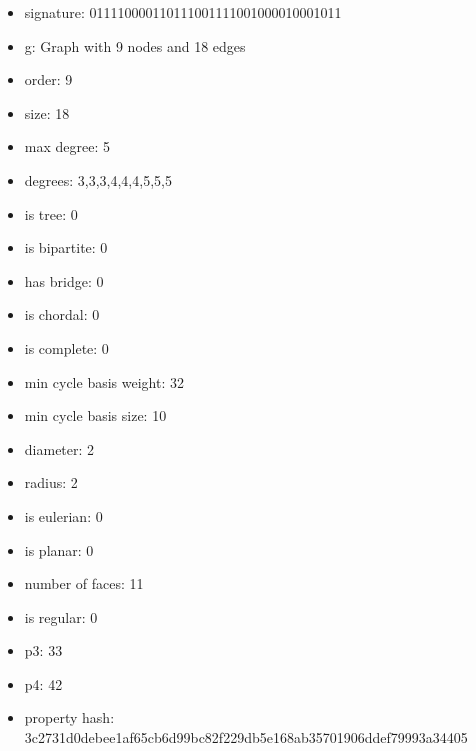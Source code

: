 \newpage
\begin{figure}
\end{figure}
\begin{itemize}
\item signature: 011110000110111001111001000010001011
\item g: Graph with 9 nodes and 18 edges
\item order: 9
\item size: 18
\item max degree: 5
\item degrees: 3,3,3,4,4,4,5,5,5
\item is tree: 0
\item is bipartite: 0
\item has bridge: 0
\item is chordal: 0
\item is complete: 0
\item min cycle basis weight: 32
\item min cycle basis size: 10
\item diameter: 2
\item radius: 2
\item is eulerian: 0
\item is planar: 0
\item number of faces: 11
\item is regular: 0
\item p3: 33
\item p4: 42
\item property hash: 3c2731d0debee1af65cb6d99bc82f229db5e168ab35701906ddef79993a34405
\end{itemize}
